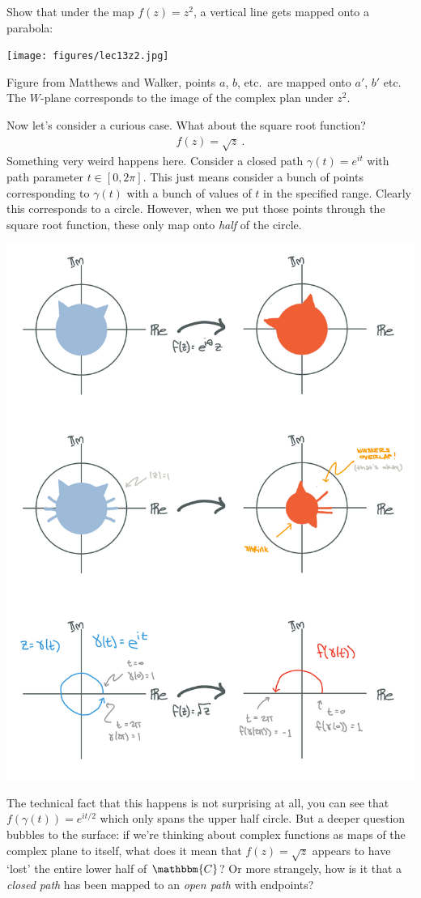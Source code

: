 \begin{exercise}
Show that under the map $f(z)=z^2$, a vertical line gets mapped onto a parabola:
\begin{center}
\texttt{[image: figures/lec13z2.jpg]}
\end{center}
Figure from Matthews and Walker, points $a$, $b$, etc.\ are mapped onto $a'$, $b'$ etc. The $W$-plane corresponds to the image of the complex plan under $z^2$.
\end{exercise}

Now let's consider a curious case. What about the square root function?
\begin{align}
	f(z) = \sqrt{z} \ .
\end{align}
Something very weird happens here. Consider a closed path $\gamma(t) = e^{it}$ with path parameter $t \in [0,2\pi]$. This just means consider a bunch of points corresponding to $\gamma(t)$ with a bunch of values of $t$ in the specified range. Clearly this corresponds to a circle. However, when we put those points through the square root function, these only map onto \emph{half} of the circle. 
\begin{center}
\includegraphics[width=.7\textwidth]{figures/Complex_04_log.pdf}
\end{center}
The technical fact that this happens is not surprising at all, you can see that $f(\gamma(t)) = e^{it/2}$ which only spans the upper half circle. But a deeper question bubbles to the surface: if we're thinking about complex functions as maps of the complex plane to itself, what does it mean that $f(z) = \sqrt{z}$ appears to have `lost' the entire lower half of $\mathbbm{C}$? Or more strangely, how is it that a \emph{closed path} has been mapped to an \emph{open path} with endpoints?

